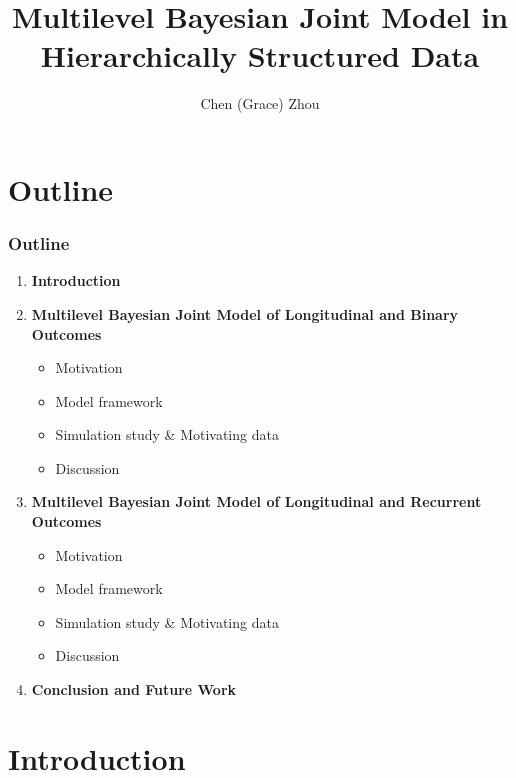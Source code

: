 \documentclass[fleqn]{beamer}
\title[Multilevel Bayesian Joint Model]
        {\bf Multilevel Bayesian Joint Model in Hierarchically Structured Data}
\author[Grace Zhou (UC)]{Chen (Grace) Zhou}
\institute[UC]{University of Cincinnati}
\begin{document}
\begin{frame}
\titlepage %
\end{frame}

\section[Outline]{Outline}
\setcounter{subsection}{1}

\begin{frame}
\frametitle{Outline}
\footnotesize
\begin{enumerate}
    \item \textbf{Introduction}
    \item \textbf{Multilevel Bayesian Joint Model of Longitudinal and Binary Outcomes}
    \begin{itemize}
        \item Motivation
        \item Model framework
        \item Simulation study \& Motivating data
        \item Discussion
    \end{itemize}
    \item \textbf{Multilevel Bayesian Joint Model of Longitudinal and Recurrent Outcomes}
    \begin{itemize}
        \item Motivation
        \item Model framework
        \item Simulation study \& Motivating data
        \item Discussion
    \end{itemize}
    \item \textbf{Conclusion and Future Work}
\end{enumerate}
\end{frame}

\section[Introduction]{Introduction}
\setcounter{subsection}{1}
\end{document}
